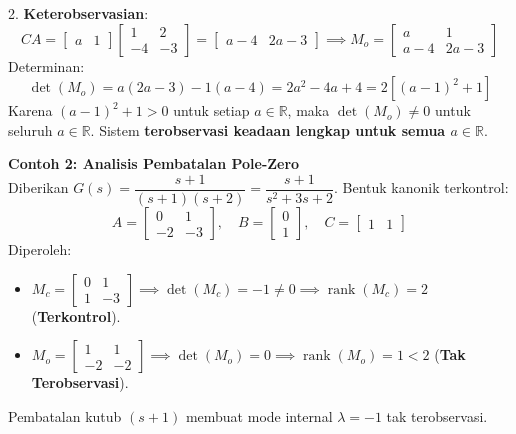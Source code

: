 \documentclass[11pt,a4paper]{article}
\begin{document}
2. \textbf{Keterobservasian}:
\begin{equation*}
    CA = \begin{bmatrix} a & 1 \end{bmatrix} \begin{bmatrix} 1 & 2 \\ -4 & -3 \end{bmatrix} = \begin{bmatrix} a - 4 & 2a - 3 \end{bmatrix} \implies M_o = \begin{bmatrix} a & 1 \\ a - 4 & 2a - 3 \end{bmatrix}
\end{equation*}
Determinan:
\begin{equation*}
    \det(M_o) = a(2a - 3) - 1(a - 4) = 2a^2 - 4a + 4 = 2[(a-1)^2 + 1]
\end{equation*}
Karena $(a-1)^2 + 1 > 0$ untuk setiap $a \in \mathbb{R}$, maka $\det(M_o) \ne 0$ untuk seluruh $a \in \mathbb{R}$.  
Sistem \textbf{terobservasi keadaan lengkap untuk semua $a \in \mathbb{R}$}.

\vspace{10pt}

\noindent\textbf{Contoh 2: Analisis Pembatalan Pole-Zero}\\
Diberikan $G(s) = \dfrac{s + 1}{(s + 1)(s + 2)} = \dfrac{s + 1}{s^2 + 3s + 2}$. Bentuk kanonik terkontrol:
\begin{equation*}
    A = \begin{bmatrix} 0 & 1 \\ -2 & -3 \end{bmatrix}, \quad B = \begin{bmatrix} 0 \\ 1 \end{bmatrix}, \quad C = \begin{bmatrix} 1 & 1 \end{bmatrix}
\end{equation*}
Diperoleh:
\begin{itemize}
    \item $M_c = \begin{bmatrix} 0 & 1 \\ 1 & -3 \end{bmatrix} \implies \det(M_c) = -1 \ne 0 \implies \operatorname{rank}(M_c) = 2$ (\textbf{Terkontrol}).
    \item $M_o = \begin{bmatrix} 1 & 1 \\ -2 & -2 \end{bmatrix} \implies \det(M_o) = 0 \implies \operatorname{rank}(M_o) = 1 < 2$ (\textbf{Tak Terobservasi}).
\end{itemize}
Pembatalan kutub $(s + 1)$ membuat mode internal $\lambda = -1$ tak terobservasi.
\end{document}
